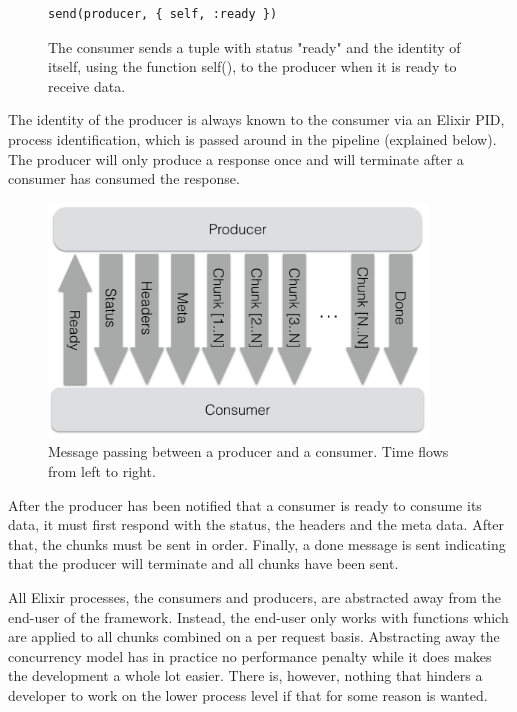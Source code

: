\documentclass{cslthse-msc}
\begin{document}
\begin{figure}[H]
  \centering
\begin{lstlisting}[breaklines=true,frame=single]
send(producer, { self, :ready })	
\end{lstlisting}
  \caption{The consumer sends a tuple with status "ready" and the identity of itself, using the function self(), to the producer when it is ready to receive data.}
\end{figure}

The identity of the producer is always known to the consumer via an Elixir PID, process identification, which is passed around in the pipeline (explained below). The producer will only produce a response once and will terminate after a consumer has consumed the response.

\begin{figure}[H]
  \centering
    \begin{center}
      \includegraphics[width=0.9\textwidth]{images/crocpear_producer_consumer.png}
    \end{center}
  \caption{Message passing between a producer and a consumer. Time flows from left to right.}
\end{figure}

After the producer has been notified that a consumer is ready to consume its data, it must first respond with the status, the headers and the meta data. After that, the chunks must be sent in order. Finally, a done message is sent indicating that the producer will terminate and all chunks have been sent.

All Elixir processes, the consumers and producers, are abstracted away from the end-user of the framework. Instead, the end-user only works with functions which are applied to all chunks combined on a per request basis. Abstracting away the concurrency model has in practice no performance penalty while it does makes the development a whole lot easier. There is, however, nothing that hinders a developer to work on the lower process level if that for some reason is wanted.
\end{document}

